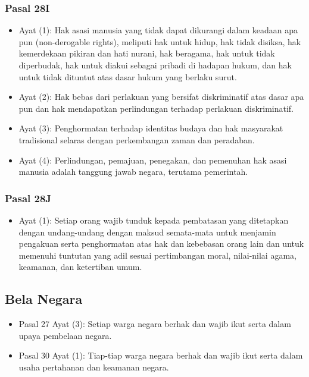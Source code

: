 \subsubsection{Pasal 28I}
\begin{itemize}
\item Ayat (1): Hak asasi manusia yang tidak dapat dikurangi dalam keadaan apa pun (non-derogable rights), meliputi hak untuk hidup, hak tidak disiksa, hak kemerdekaan pikiran dan hati nurani, hak beragama, hak untuk tidak diperbudak, hak untuk diakui sebagai pribadi di hadapan hukum, dan hak untuk tidak dituntut atas dasar hukum yang berlaku surut.
\item Ayat (2): Hak bebas dari perlakuan yang bersifat diskriminatif atas dasar apa pun dan hak mendapatkan perlindungan terhadap perlakuan diskriminatif.
\item Ayat (3): Penghormatan terhadap identitas budaya dan hak masyarakat tradisional selaras dengan perkembangan zaman dan peradaban.
\item Ayat (4): Perlindungan, pemajuan, penegakan, dan pemenuhan hak asasi manusia adalah tanggung jawab negara, terutama pemerintah.
\end{itemize}

\subsubsection{Pasal 28J}
\begin{itemize}
\item Ayat (1): Setiap orang wajib tunduk kepada pembatasan yang ditetapkan dengan undang-undang dengan maksud semata-mata untuk menjamin pengakuan serta penghormatan atas hak dan kebebasan orang lain dan untuk memenuhi tuntutan yang adil sesuai pertimbangan moral, nilai-nilai agama, keamanan, dan ketertiban umum.
\end{itemize}

\subsection{Bela Negara}
\begin{itemize}
\item Pasal 27 Ayat (3): Setiap warga negara berhak dan wajib ikut serta dalam upaya pembelaan negara.
\item Pasal 30 Ayat (1): Tiap-tiap warga negara berhak dan wajib ikut serta dalam usaha pertahanan dan keamanan negara.
\end{itemize}

